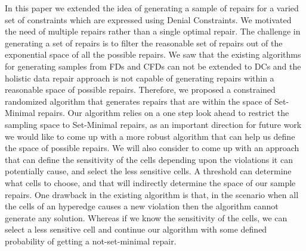 In this paper we extended the idea of generating a sample of repairs for a varied set of constraints which are expressed using Denial Constraints.
We motivated the need of multiple repairs rather than a single optimal repair.
The challenge in generating a set of repairs is to filter the reasonable set of repairs out of the exponential space of all the possible repairs.
We saw that the existing algorithms for generating samples from FDs and CFDs can not be extended to DCs and the holistic data repair approach is not capable of generating repairs within a reasonable space of possible repairs.
Therefore, we proposed a constrained randomized algorithm that generates repairs that are within the space of Set-Minimal repairs.
Our algorithm relies on a one step look ahead to restrict the sampling space to Set-Minimal repairs, 
as an important direction for future work we would like to come up with a more robust algorithm that can help us define the space of possible repairs.
We will also consider to come up with an approach that can define the sensitivity of the cells depending upon the violations it can potentially cause, and select the less sensitive cells.
A threshold can determine what cells to choose, and that will indirectly determine the space of our sample repairs.
One drawback in the existing algorithm is that, in the scenario when all the cells of an hyperedge causes a new violation then the algorithm cannot generate any solution.
Whereas if we know the sensitivity of the cells, we can select a less sensitive cell and continue our algorithm with some defined probability of getting a not-set-minimal repair.
